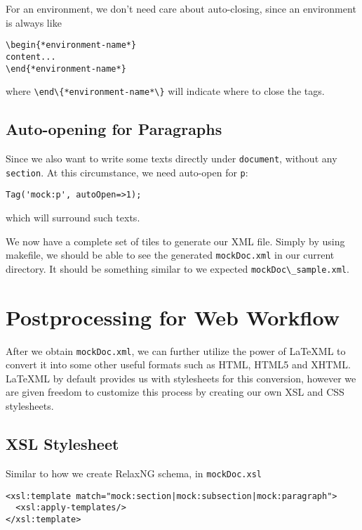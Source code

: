 \documentclass[a4paper]{article}
\def\latexml{{\LaTeX}ML\xspace}
\begin{document}
 For an environment, we don't need care about auto-closing, since an environment is always like
\begin{lstlisting}
\begin{*environment-name*}
content...
\end{*environment-name*}
\end{lstlisting}
where \lstinline|\end\{*environment-name*\}| will indicate where to close the tags.

\subsection{Auto-opening for Paragraphs}
Since we also want to write some texts directly under \lstinline|document|, without any \lstinline|section|. At this circumstance, we need auto-open for \lstinline|p|:
\begin{lstlisting}
Tag('mock:p', autoOpen=>1);
\end{lstlisting}
which will surround such texts.


We now have a complete set of tiles to generate our XML file. Simply by using makefile, we should be able to see the generated \lstinline|mockDoc.xml| in our current directory. It should be something similar to we expected
\lstinline|mockDoc\_sample.xml|.
  
\section{Postprocessing for Web Workflow}\label{sec:posp}
After we obtain \lstinline|mockDoc.xml|, we can further utilize the power of \latexml to convert it into some other
useful formats such as HTML, HTML5 and XHTML. \latexml by default provides us with stylesheets for this conversion, however we are given freedom to customize this process by creating our own XSL and CSS stylesheets.

\subsection{XSL Stylesheet}
Similar to how we create RelaxNG schema, in \lstinline|mockDoc.xsl|
\begin{lstlisting}
<xsl:template match="mock:section|mock:subsection|mock:paragraph">
  <xsl:apply-templates/>
</xsl:template>
\end{lstlisting}
\end{document}
